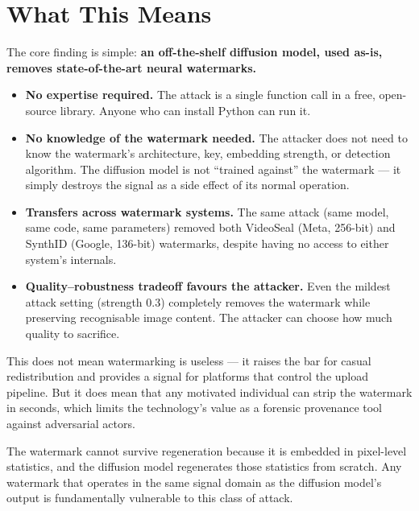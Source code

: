\documentclass[11pt,a4paper]{article}
\begin{document}
\section{What This Means}

The core finding is simple: \textbf{an off-the-shelf diffusion model,
used as-is, removes state-of-the-art neural watermarks.}

\begin{itemize}[leftmargin=2em]
  \item \textbf{No expertise required.} The attack is a single function
    call in a free, open-source library. Anyone who can install Python
    can run it.
  \item \textbf{No knowledge of the watermark needed.} The attacker
    does not need to know the watermark's architecture, key, embedding
    strength, or detection algorithm. The diffusion model is not
    ``trained against'' the watermark --- it simply destroys the signal
    as a side effect of its normal operation.
  \item \textbf{Transfers across watermark systems.} The same attack
    (same model, same code, same parameters) removed both VideoSeal
    (Meta, 256-bit) and SynthID (Google, 136-bit) watermarks, despite
    having no access to either system's internals.
  \item \textbf{Quality--robustness tradeoff favours the attacker.}
    Even the mildest attack setting (strength 0.3) completely removes
    the watermark while preserving recognisable image content. The
    attacker can choose how much quality to sacrifice.
\end{itemize}

This does not mean watermarking is useless --- it raises the bar for
casual redistribution and provides a signal for platforms that control
the upload pipeline. But it does mean that any motivated individual can
strip the watermark in seconds, which limits the technology's value as
a forensic provenance tool against adversarial actors.

The watermark cannot survive regeneration because it is embedded in
pixel-level statistics, and the diffusion model regenerates those
statistics from scratch. Any watermark that operates in the same signal
domain as the diffusion model's output is fundamentally vulnerable to
this class of attack.
\end{document}
